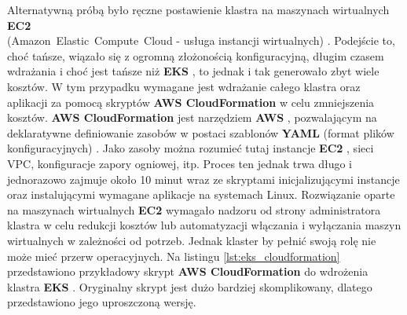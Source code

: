 Alternatywną próbą było ręczne postawienie klastra na maszynach wirtualnych \textbf{EC2} \\ (\mbox{Amazon Elastic Compute Cloud} - usługa instancji wirtualnych) \cite{ec2_docs}. Podejście to, choć tańsze, wiązało się z ogromną złożonością konfiguracyjną, długim czasem wdrażania i choć jest tańsze niż \textbf{EKS} \cite{eks_docs}, to jednak i tak generowało zbyt wiele kosztów. W tym przypadku wymagane jest wdrażanie całego klastra oraz aplikacji za pomocą skryptów \textbf{AWS CloudFormation} \cite{cloudformation_docs} w celu zmniejszenia kosztów. \textbf{AWS CloudFormation} \cite{cloudformation_docs} jest narzędziem \textbf{AWS} \cite{aws_docs}, pozwalającym na deklaratywne definiowanie zasobów w postaci szablonów \textbf{YAML} (format plików konfiguracyjnych) \cite{yaml_spec}. Jako zasoby można rozumieć tutaj instancje \textbf{EC2} \cite{ec2_docs}, sieci VPC, konfiguracje zapory ogniowej, itp. Proces ten jednak trwa długo i jednorazowo zajmuje około 10 minut wraz ze skryptami inicjalizującymi instancje oraz instalującymi wymagane aplikacje na systemach Linux. Rozwiązanie oparte na maszynach wirtualnych \textbf{EC2} \cite{ec2_docs} wymagało nadzoru od strony administratora klastra w celu redukcji kosztów lub automatyzacji włączania i wyłączania maszyn wirtualnych w zależności od potrzeb. Jednak klaster by pełnić swoją rolę nie może mieć przerw operacyjnych. Na listingu \ref{lst:eks_cloudformation} przedstawiono przykładowy skrypt \textbf{AWS CloudFormation} \cite{cloudformation_docs} do wdrożenia klastra \textbf{EKS} \cite{eks_docs}. Oryginalny skrypt jest dużo bardziej skomplikowany, dlatego przedstawiono jego uproszczoną wersję.

